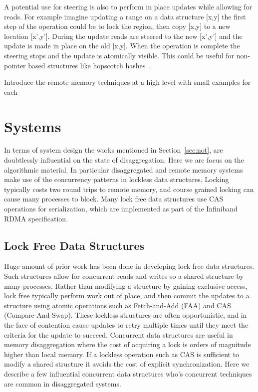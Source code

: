 A potential use for steering is also to perform in place updates while allowing
for reads. For example imagine updating a range on a data structure [x,y] the
first step of the operation could be to lock the region, then copy [x,y] to a
new location [x',y']. During the update reads are steered to the new [x',y'] and
the update is made in place on the old [x,y]. When the operation is complete the
steering stops and the update is atomically visible. This could be useful for
non-pointer based structures like hopscotch hashes~\cite{hopscotch}.


Introduce the remote memory techniques at a high level with small examples for each

\section{Systems}
In terms of system design the works mentioned in Section~\ref{sec:not}, are
doubtlessly influential on the state of disaggregation. Here we are focus on the
algorithmic material. In particular disaggregated and remote memory systems make
use of the concurrency patterns in lockless data structures. Locking typically
costs two round trips to remote memory, and course grained locking can cause
many processes to block. Many lock free data structures use CAS operations for
serialization, which are implemented as part of the Infiniband RDMA
specification.

\subsection{Lock Free Data Structures}

Huge amount of prior work has been done in developing lock free data structures.
Such structures allow for concurrent reads and writes so a shared structure by
many processes. Rather than modifying a structure by gaining exclusive access,
lock free typically perform work out of place, and then commit the updates to a
structure using atomic operations such as Fetch-and-Add (FAA) and CAS
(Compare-And-Swap). These lockless structures are often opportunistic, and in
the face of contention cause updates to retry multiple times until they meet the
criteria for the update to succeed. Concurrent data structures are useful in
memory disaggregation where the cost of acquiring a lock is orders of magnitude
higher than local memory. If a lockless operation such as CAS is sufficient to
modify a shared structure it avoids the cost of explicit synchronization. Here
we describe a few influential concurrent data structures who's concurrent
techniques are common in disaggregated systems.

